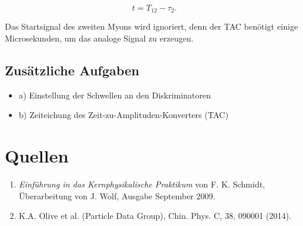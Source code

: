 \documentclass[a4paper,ngerman]{scrartcl}
\begin{document}
\begin{equation}
t = T_{12} - \tau_2 .
\end{equation}

Das Startsignal des zweiten Myons wird ignoriert, denn der TAC benötigt einige Microsekunden, um das analoge Signal zu erzeugen.



\subsection{Zusätzliche Aufgaben}

\begin{itemize}
\item a) Einstellung der Schwellen an den Diskriminatoren
\item b) Zeiteichung des Zeit-zu-Amplituden-Konverters (TAC)
\end{itemize}



\clearpage
\section{Quellen}
\begin{enumerate}
\item \emph{Einführung in das Kernphysikalische Praktikum} von F. K. Schmidt, 
  Überarbeitung von J. Wolf, Ausgabe September 2009. \label{ref:bb}
\item K.A. Olive et al. (Particle Data Group), Chin. Phys. C, 38, 090001 (2014). \label{ref:pdg14}
\end{enumerate}
\end{document}
